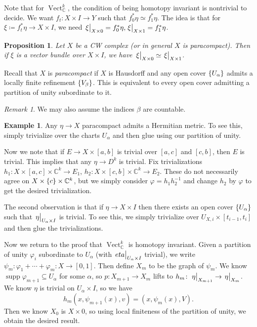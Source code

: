\documentclass[leqno, openany]{memoir}
\newtheorem{prop}[thm]{Proposition}
\theoremstyle{definition}
\newtheorem{exm}[thm]{Example}
\theoremstyle{remark}
\newtheorem{rmk}[thm]{Remark}
\theoremstyle{plain}
\theoremstyle{definition}
\theoremstyle{remark}
\newcommand{\C}{\mathbb{C}}
\DeclareMathOperator{\Vect}{Vect}
\begin{document}
Note that for $\Vect_{\C}^k$, the condition of being homotopy invariant is nontrivial to decide. We want $f_t \colon X \times I \to Y$ such that $f_0^* \eta \simeq f_1^* \eta$. The idea is that for $\xi \coloneqq f_t^* \eta \to X \times I$, we need $\eval{\xi}_{X \times 0} = f_0^* \eta, \eval{\xi}_{X \times 1} = f_1^* \eta$.

\begin{prop}
    Let $X$ be a CW complex (or in general $X$ is paracompact). Then if $\xi$ is a vector bundle over $X \times I$, we have $\eval{\xi}_{X \times 0} \simeq \eval{\xi}_{X \times 1}$.
\end{prop}

Recall that $X$ is \textit{paracompact} if $X$ is Hausdorff and any open cover $\qty{U_{\alpha}}$ admits a locally finite refinement $\qty{V_{\beta}}$. This is equivalent to every open cover admitting a partition of unity subordinate to it.

\begin{rmk}
    We may also assume the indices $\beta$ are countable.
\end{rmk}

\begin{exm}
    Any $\eta \to X$ paracompact admits a Hermitian metric. To see this, simply trivialize over the charts $U_{\alpha}$ and then glue using our partition of unity.
\end{exm}

Now we note that if $E \to X \times [a,b]$ is trivial over $[a,c]$ and $[c,b]$, then $E$ is trivial. This implies that any $\eta \to D^k$ is trivial. Fix trivializations $h_1 \colon X \times [a,c] \times \C^k \to E_1$, $h_2 \colon X \times [c,b] \times \C^k \to E_2$. These do not necessarily agree on $X \times \qty{c} \times \C^k$, but we simply consider $\varphi = h_1 h_2^{-1}$ and change $h_2$ by $\varphi$ to get the desired trivialization.

The second observation is that if $\eta \to X \times I$ then there exists an open cover $\qty{U_{\alpha}}$ such that $\eval{\eta}_{U_{\alpha} \times I}$ is trivial. To see this, we simply trivialize over $U_{X,i} \times [t_{i-1}, t_i]$ and then glue the trivializations.

Now we return to the proof that $\Vect_{\C}^k$ is homotopy invariant. Given a partition of unity $\varphi_i$ subordinate to $U_{\alpha}$ (with $\eval{eta}_{U_{\alpha} \times I}$ trivial), we write $\psi_m \colon \varphi_1 + \cdots + \varphi_m \colon X \to [0,1]$. Then define $X_m$ to be the graph of $\psi_m$. We know $\operatorname{supp} \varphi_{m+1} \subseteq U_{\alpha}$ for some $\alpha$, so $p \colon X_{m+1} \to X_m$ lifts to $h_m \colon \eval{\eta}_{X_{m+1}} \to \eval{\eta}_{X_m}$. We know $\eta$ is trivial on $U_{\alpha} \times I$, so we have
\[ h_m(x, \psi_{m+1}(x), v) = (x, \psi_m(x), V). \]
Then we know $X_0$ is $X \times \qty{0}$, so using local finiteness of the partition of unity, we obtain the desired result.
\end{document}

